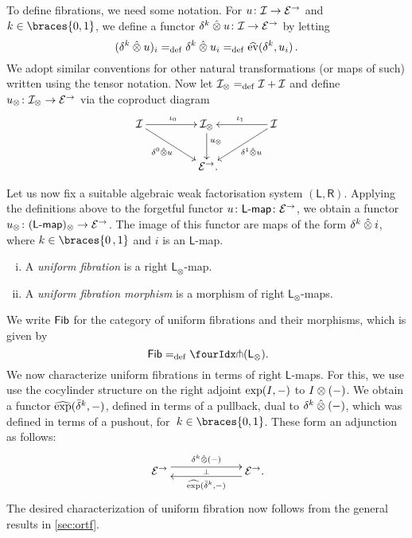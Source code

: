 \documentclass[reqno,10pt,a4paper,oneside,draft]{amsart}
\newcommand{\LL}{\mathsf{L}}
\newcommand{\RR}{\mathsf{R}}
\begin{document}
{{To define fibrations, we need some notation. For $u \colon \mathcal{I} \to \mathcal{E}^\to$ and $k \in \braces{0, 1}$, we define a functor $\delta^k \mathbin{\hat{\otimes}} u \colon \mathcal{I} \to \mathcal{E}^\to$ by letting
\[
  (\delta^k \mathbin{\hat{\otimes}} u)_i =_{\operatorname{def}} \delta^k \mathbin{\hat{\otimes}} u_i  =_{\operatorname{def}} \widehat{\operatorname{ev}}(\delta^k, u_i) \, .
\]
We adopt similar conventions for other natural transformations (or maps of such) written using the tensor notation.
Now let $\mathcal{I}_\otimes =_{\operatorname{def}} \mathcal{I} + \mathcal{I}$ and define $u_\otimes \colon \mathcal{I}_\otimes \to \mathcal{E}^\to$ via the coproduct diagram
\begin{equation} \label{equ:u-tensor}
\begin{gathered}
\xymatrix@C+2em{
  \cal{I}
  \ar[r]^{\iota_0}
  \ar[dr]_-{\lcyl \hatotimes u}
&
  \cal{I}_\otimes
  \ar[d]^(.4){u_\otimes}
&
  \cal{I}
  \ar[dl]^-{\rcyl \hatotimes u}
  \ar[l]_{\iota_1}
\\&
  \catE^\to
\rlap{.}}
\end{gathered}
\end{equation}

Let us now fix a suitable algebraic weak factorisation system $(\LL, \RR)$. Applying the definitions above  to the forgetful
functor $u \co \pcoalg{\LL} \co \cal{E}^\to$, we obtain a functor $u_\otimes \co (\pcoalg{\LL})_\otimes \to \cal{E}^\to$. 
The image of this functor are maps of the form $\delta^k \mathbin{\hat{\otimes}} i$, where $k \in \braces{ 0 \, , 1}$ and $i$ is an $\LL$-map.


\begin{definition} \label{def:I-fibration} \hfill 
\begin{enumerate}[(i)]
\item A \emph{uniform fibration} is a right $\LL_\otimes$-map.
\item A \emph{uniform fibration morphism} is a morphism of right $\LL_\otimes$-maps.
\end{enumerate}
\end{definition}


We write $\mathsf{Fib}{}$ for the category of uniform fibrations and their morphisms, which is given by 
\[
  \Fib{}  \defeq \liftr{(\LL_\otimes)} \rlap{.}
\]
We now characterize uniform fibrations in terms of right $\LL$-maps. For this, we use use the cocylinder structure on the right adjoint $\exp(I, -)$ to $I \otimes (-)$. We obtain a functor $\operatorname{\widehat{exp}}(\bar{\delta}^k, -)$, defined in terms of a pullback, dual to $\delta^k \mathbin{\hat{\otimes}} (-)$, which was defined in terms of a pushout, for~$k \in \braces{0, 1}$. These form an adjunction as follows:
\[
\xymatrix@C+4em{
  \catE^\to
  \ar@<1ex>[r]^{\kcyl \hatotimes (-)}
  \ar@{}[r]|{\bot}
&
  \catE^\to
  \ar@<1ex>[l]^{\hatexp(\bar{\delta}^k, -)}
\rlap{.}}
\]
The desired characterization of uniform fibration now follows from the general results in \cref{sec:ortf}.

}}
\end{document}
